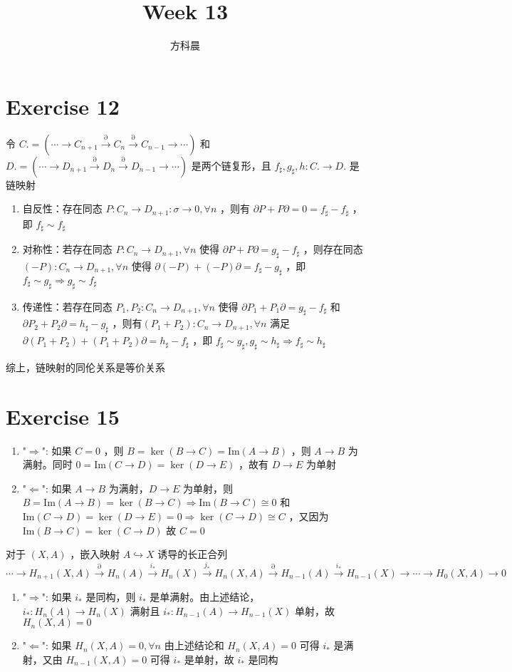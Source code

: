 \documentclass[12pt]{article}
\title{Week 13}
\author{方科晨}
\begin{document}
\maketitle
\section{Exercise 12}
令 $C.=(\cdots\longrightarrow C_{n+1}\stackrel{\partial}{\longrightarrow}C_n\stackrel{\partial}{\longrightarrow}C_{n-1}\longrightarrow\cdots)$ 和 $D.=(\cdots\longrightarrow D_{n+1}\stackrel{\partial}{\longrightarrow}D_n\stackrel{\partial}{\longrightarrow}D_{n-1}\longrightarrow\cdots)$ 是两个链复形，且 $f_\sharp,g_\sharp,h:C.\to D.$ 是链映射
\begin{enumerate}
    \item 自反性：存在同态 $P:C_n\to D_{n+1}:\sigma\to 0,\forall n$ ，则有 $\partial P+P\partial = 0 = f_\sharp-f_\sharp$ ，即 $f_\sharp\sim f_\sharp$ 
    \item 对称性：若存在同态 $P:C_n\to D_{n+1},\forall n$ 使得 $\partial P+P\partial=g_\sharp-f_\sharp$ ，则存在同态 $(-P):C_n\to D_{n+1},\forall n$ 使得 $\partial(-P)+(-P)\partial=f_\sharp-g_\sharp$ ，即 $f_\sharp\sim g_\sharp\Rightarrow g_\sharp\sim f_\sharp$
    \item 传递性：若存在同态 $P_1,P_2:C_n\to D_{n+1},\forall n$ 使得 $\partial P_1+P_1\partial=g_\sharp-f_\sharp$ 和 $\partial P_2+P_2\partial=h_\sharp-g_\sharp$ ，则有$(P_1+P_2):C_n\to D_{n+1},\forall n$ 满足 $\partial(P_1+P_2)+(P_1+P_2)\partial=h_\sharp-f_\sharp$ ，即 $f_\sharp\sim g_\sharp,g_\sharp\sim h_\sharp\Rightarrow f_\sharp\sim h_\sharp$
\end{enumerate}
综上，链映射的同伦关系是等价关系
\section{Exercise 15}
\begin{enumerate}
    \item "$\Rightarrow$": 如果 $C=0$ ，则 $B=\ker(B\to C)=\textrm{Im}(A\to B)$ ，则 $A\to B$ 为满射。同时 $0=\textrm{Im}(C\to D)=\ker (D\to E)$ ，故有 $D\to E$ 为单射
    \item "$\Leftarrow$": 如果 $A\to B$ 为满射，$D\to E$ 为单射，则 $B=\textrm{Im}(A\to B)=\ker(B\to C)\Rightarrow \textrm{Im}(B\to C)\cong 0$ 和 $\textrm{Im}(C\to D)=\ker(D\to E)= 0\Rightarrow \ker (C\to D)\cong C$ ，又因为 $\textrm{Im}(B\to C)=\ker (C\to D)$ 故 $C=0$
\end{enumerate}
对于 $(X,A)$ ，嵌入映射 $A\hookrightarrow X$ 诱导的长正合列 $\cdots\to H_{n+1}(X,A)\stackrel{\partial}{\to} H_n(A)\stackrel{i_*}{\to} H_n(X)\stackrel{j_*}{\to}H_n(X,A)\stackrel{\partial}{\to} H_{n-1}(A)\stackrel{i_*}{\to} H_{n-1}(X)\stackrel{}{\to} \cdots \to H_0(X,A)\to 0$
\begin{enumerate}
    \item "$\Rightarrow$": 如果 $i_*$ 是同构，则 $i_*$ 是单满射。由上述结论， $i_*:H_n(A)\to H_n(X)$ 满射且 $i_*:H_{n-1}(A)\to H_{n-1}(X)$ 单射，故 $H_n(X,A)=0$
    \item "$\Leftarrow$": 如果 $H_n(X,A)=0,\forall n$ 由上述结论和 $H_n(X,A)=0$ 可得 $i_*$ 是满射，又由 $H_{n-1}(X,A)=0$ 可得 $i_*$ 是单射，故 $i_*$ 是同构
\end{enumerate}
\end{document}
